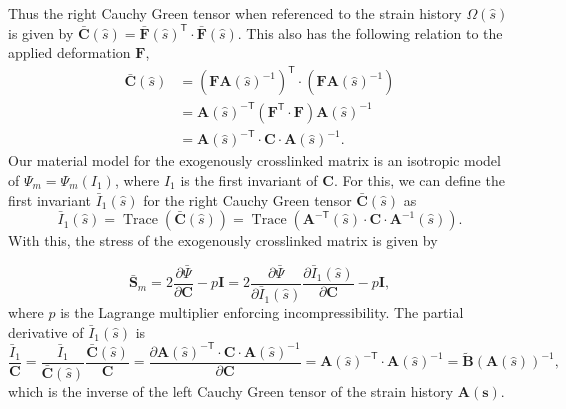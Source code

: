 Thus the right Cauchy Green tensor when referenced to the strain history $\Omega(\hat{s})$ is given by $\mathbf{\bar{C}}(\hat{s}) = \mathbf{\bar{F}}(\hat{s})^\mathsf{T} \cdot \mathbf{\bar{F}}(\hat{s})$. This also has the following relation to the applied deformation $\mathbf{F}$,
\begin{equation} \label{eq:rightcauchy}
\begin{split}
\mathbf{\bar{C}}(\hat{s}) &= \left( \mathbf{F}\mathbf{A}(\hat{s})^{-1} \right)^\mathsf{T} \cdot \left(\mathbf{F}\mathbf{A}(\hat{s})^{-1} \right)\\
										   &= \mathbf{A}(\hat{s})^{-\mathsf{T}} \left( \mathbf{F}^\mathsf{T} \cdot \mathbf{F} \right) \mathbf{A}(\hat{s})^{-1} \\
										   &= \mathbf{A}(\hat{s})^{-\mathsf{T}} \cdot \mathbf{C} \cdot \mathbf{A}(\hat{s})^{-1}.
\end{split}
\end{equation}
Our material model for the exogenously crosslinked matrix is an isotropic model of $\Psi_m = \Psi_m(I_1)$, where $I_1$ is the first invariant of $\mathbf{C}$. For this, we can define the first invariant $\bar{I}_1(\hat{s})$ for the right Cauchy Green tensor $\bar{\mathbf{C}}(\hat{s})$ as 
\begin{equation}\label{eq:pseudo1stinv}
\bar{I}_1(\hat{s}) = \operatorname{Trace}(\mathbf{\bar{C}}(\hat{s})) = \operatorname{Trace}\left(\mathbf{A}^{-\mathsf{T}}(\hat{s}) \cdot \mathbf{C} \cdot \mathbf{A}^{-1}(\hat{s})\right).
\end{equation}
With this, the stress of the exogenously crosslinked matrix is given by 

\begin{equation}
\mathbf{\bar{S}}_m = 2 \frac{\partial \bar{\Psi}}{\partial \mathbf{C}} - p\mathbf{I} = 2 \frac{\partial \bar{\Psi}}{\partial \bar{I}_1(\hat{s})} \frac{\partial \bar{I}_1(\hat{s})}{\partial \mathbf{C}} - p\mathbf{I},
\end{equation}
where $p$ is the Lagrange multiplier enforcing incompressibility. The partial derivative of $\bar{I}_1(\hat{s})$ is
\begin{equation}
\frac{\bar{I}_1}{\mathbf{C}} = \frac{\bar{I}_1}{\bar{\mathbf{C}}(\hat{s})} \frac{\bar{\mathbf{C}}(\hat{s})}{\mathbf{C}}= \frac{\partial \mathbf{A}(\hat{s})^{-\mathsf{T}} \cdot \mathbf{C} \cdot \mathbf{A}(\hat{s})^{-1}}{\partial \mathbf{C}} = \mathbf{A}(\hat{s})^{-\mathsf{T}} \cdot \mathbf{A}(\hat{s})^{-1} = \mathbf{\tilde{B}}(\mathbf{A}(\hat{s}))^{-1},
\end{equation}
which is the inverse of the left Cauchy Green tensor of the strain history $\mathbf{A(s)}$.

